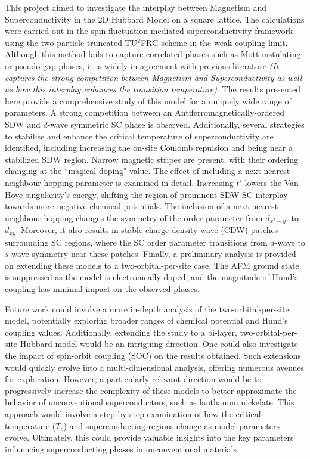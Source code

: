 \documentclass[11pt]{article}
\begin{document}
This project aimed to investigate the interplay between Magnetism and Superconductivity in the 2D Hubbard Model on a square lattice. The calculations were carried out
in the spin-fluctuation mediated superconductivity framework using the two-particle truncated TU$^2$FRG scheme in the weak-coupling limit. Although this method
fails to capture correlated phases such as Mott-instulating or pseudo-gap phases, it is widely in agreement with previous literature \textit{(It captures the strong competition between Magnetism and Superconductivity
as well as how this interplay enhances the transition temperature)}. The results presented here provide
a comprehensive study of this model for a uniquely wide range of parameters. A strong competition between an
Antiferromagnetically-ordered SDW and $d$-wave symmetric SC phase is observed. 
Additionally, several strategies to stabilise and enhance the critical temperature of superconductivity are identified, including increasing the on-site Coulomb repulsion and being near a stabilized SDW region.
Narrow magnetic stripes are present, with their ordering changing at the ``magical doping" value. 
The effect of including a next-nearest neighbour hopping parameter is examined in detail. Increasing $t'$ lowers the Van Hove singularity's energy, shifting the region of prominent SDW-SC interplay towards more negative chemical potentials.
The inclusion of a next-nearest-neighbour hopping changes the symmetry of the order parameter from $d_{x^2-y^2}$ to $d_{xy}$.
Moreover, it also results in stable charge density wave (CDW) 
patches surrounding SC regions, where the SC order parameter transitions from $d$-wave to $s$-wave symmetry near these patches. 
Finally, a preliminary analysis is provided on extending these models to a 
two-orbital-per-site case. The AFM ground state is suppressed as the model is electronically doped, and the magnitude of Hund's 
coupling has minimal impact on the observed phases.\par


\medskip

\noindent Future work could involve a more in-depth analysis of the two-orbital-per-site model, potentially exploring broader ranges of 
chemical potential and Hund's coupling values. Additionally, extending the study to a bi-layer, two-orbital-per-site Hubbard model would be an intriguing direction. One could also investigate the 
impact of spin-orbit coupling (SOC) on the results obtained. Such extensions would quickly evolve into a multi-dimensional 
analysis, offering numerous avenues for exploration. However, a particularly relevant direction would be to progressively increase
the complexity of these models to better approximate the behavior of unconventional superconductors, 
such as lanthanum nickelate. This approach would involve a step-by-step examination of how the critical temperature ($T_c$) and superconducting 
regions change as model parameters evolve. Ultimately, this could provide valuable insights into the key parameters influencing superconducting 
phases in unconventional materials.
\end{document}
